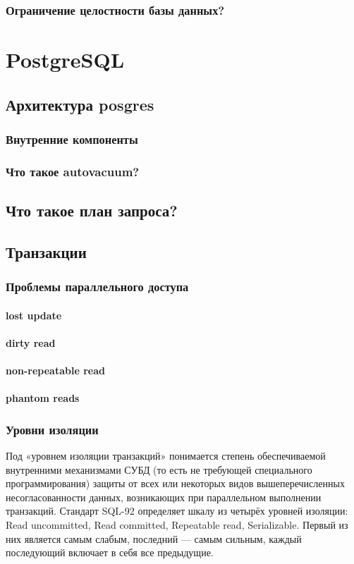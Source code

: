 \subsection{Ограничение целостности базы данных?}

\chapter{PostgreSQL}

\section{Архитектура posgres}
\subsection{Внутренние компоненты}
\subsection{Что такое autovacuum?}
\section{Что такое план запроса?}

\section{Транзакции}

\subsection{Проблемы параллельного доступа}
\subsubsection{lost update}
\subsubsection{dirty read}
\subsubsection{non-repeatable read}
\subsubsection{phantom reads}

\subsection{Уровни изоляции}
Под «уровнем изоляции транзакций» понимается степень обеспечиваемой внутренними механизмами СУБД (то есть не требующей специального программирования) защиты от всех или некоторых видов вышеперечисленных несогласованности данных, возникающих при параллельном выполнении транзакций. Стандарт SQL-92 определяет шкалу из четырёх уровней изоляции: Read uncommitted, Read committed, Repeatable read, Serializable. Первый из них является самым слабым, последний — самым сильным, каждый последующий включает в себя все предыдущие. 

